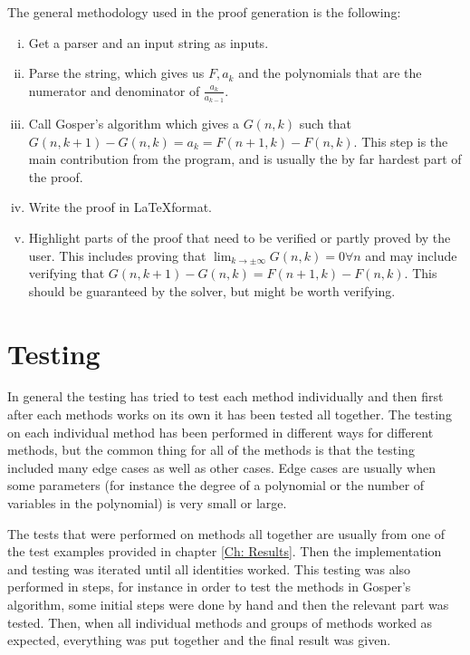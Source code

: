 The general methodology used in the proof generation is the following:
\begin{enumerate}[i)]
  \item Get a parser and an input string as inputs.
  \item Parse the string, which gives us $F,a_k$ and the polynomials that are the numerator and denominator of $\frac{a_k}{a_{k-1}}$.
  \item Call Gosper's algorithm which gives a $G(n,k)$ such that $G(n,k+1)-G(n,k)=a_k=F(n+1,k)-F(n,k)$. This step is the main contribution from the program, and is usually the by far hardest part of the proof.
  \item Write the proof in \LaTeX format.
  \item Highlight parts of the proof that need to be verified or partly proved by the user. This includes proving that $\lim_{k\to\pm\infty}G(n,k)=0\forall n$ and may include verifying that $G(n,k+1)-G(n,k)=F(n+1,k)-F(n,k)$. This should be guaranteed by the solver, but might be worth verifying.
\end{enumerate}
\section{Testing}
In general the testing has tried to test each method individually and then first after each methods works on its own it has been tested all together. The testing on each individual method has been performed in different ways for different methods, but the common thing for all of the methods is that the testing included many edge cases as well as other cases. Edge cases are usually when some parameters (for instance the degree of a polynomial or the number of variables in the polynomial) is very small or large.

The tests that were performed on methods all together are usually from one of the test examples provided in chapter \ref{Ch: Results}. Then the implementation and testing was iterated until all identities worked. This testing was also performed in steps, for instance in order to test the methods in Gosper's algorithm, some initial steps were done by hand and then the relevant part was tested. Then, when all individual methods and groups of methods worked as expected, everything was put together and the final result was given.
